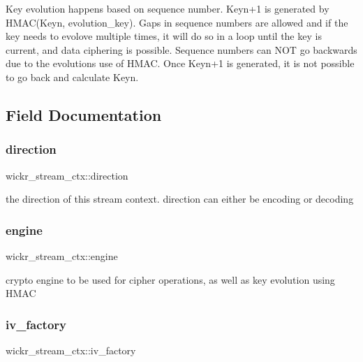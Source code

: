 Key evolution happens based on sequence number. Keyn+1 is generated by H\+M\+A\+C(\+Keyn, evolution\+\_\+key). Gaps in sequence numbers are allowed and if the key needs to evolove multiple times, it will do so in a loop until the key is current, and data ciphering is possible. Sequence numbers can N\+OT go backwards due to the evolution\textquotesingle{}s use of H\+M\+AC. Once Keyn+1 is generated, it is not possible to go back and calculate Keyn. 

\subsection{Field Documentation}
\mbox{\label{structwickr__stream__ctx_a34c622c3ca61348321261ee7a9c3ff91}} 
\subsubsection{\texorpdfstring{direction}{direction}}
{\footnotesize\ttfamily wickr\+\_\+stream\+\_\+ctx\+::direction}

the direction of this stream context. direction can either be encoding or decoding \mbox{\label{structwickr__stream__ctx_a14ef322bbeec579ded7f35c5aeb0d3fa}} 
\subsubsection{\texorpdfstring{engine}{engine}}
{\footnotesize\ttfamily wickr\+\_\+stream\+\_\+ctx\+::engine}

crypto engine to be used for cipher operations, as well as key evolution using H\+M\+AC \mbox{\label{structwickr__stream__ctx_a67c5066e87dbdc026358563daa51f174}} 
\subsubsection{\texorpdfstring{iv\+\_\+factory}{iv\_factory}}
{\footnotesize\ttfamily wickr\+\_\+stream\+\_\+ctx\+::iv\+\_\+factory}


